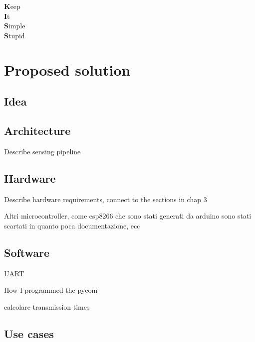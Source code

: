 
\begin{savequote}[70mm]
	\textbf{K}eep\\
	\textbf{I}t\\
	\textbf{S}imple\\
	\textbf{S}tupid\\
\end{savequote}

\chapter{Proposed solution}\label{chapter:proposed_solution}

\section{Idea}

\section{Architecture}

Describe sensing pipeline 

\section{Hardware}

Describe hardware requirements, connect to the sections in chap 3 

Altri microcontroller, come esp8266 che sono stati generati da arduino sono stati scartati in quanto poca documentazione, ecc

\section{Software}



UART

How I programmed the pycom



calcolare transmission times

\section{Use cases}

